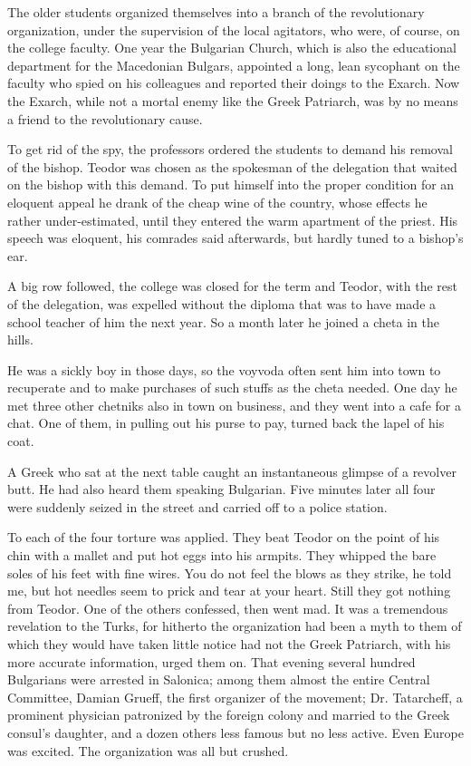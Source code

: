 \documentclass[a5paper,12pt]{book}
\begin{document}
The older students organized themselves into a branch of the revolutionary organization, under the supervision of the local agitators, who were, of course, on the college faculty. One year the Bulgarian Church, which is also the educational department for the Macedonian Bulgars, appointed a long, lean sycophant on the faculty who spied on his colleagues and reported their doings to the Exarch. Now the Exarch, while not a mortal enemy like the Greek Patriarch, was by no means a friend to the revolutionary cause.

To get rid of the spy, the professors ordered the students to demand his removal of the bishop. Teodor was chosen as the spokesman of the delegation that waited on the bishop with this demand. To put himself into the proper condition for an eloquent appeal he drank of the cheap wine of the country, whose effects he rather under-estimated, until they entered the warm apartment of the priest. His speech was eloquent, his comrades said afterwards, but hardly tuned to a bishop's ear.

A big row followed, the college was closed for the term and Teodor, with the rest of the delegation, was expelled without the diploma that was to have made a school teacher of him the next year. So a month later he joined a cheta in the hills.

He was a sickly boy in those days, so the voyvoda often sent him into town to recuperate and to make purchases of such stuffs as the cheta needed. One day he met three other chetniks also in town on business, and they went into a cafe for a chat. One of them, in pulling out his purse to pay, turned back the lapel of his coat.

A Greek who sat at the next table caught an instantaneous glimpse of a revolver butt. He had also heard them speaking Bulgarian. Five minutes later all four were suddenly seized in the street and carried off to a police station.

To each of the four torture was applied. They beat Teodor on the point of his chin with a mallet and put hot eggs into his armpits. They whipped the bare soles of his feet with fine wires. You do not feel the blows as they strike, he told me, but hot needles seem to prick and tear at your heart. Still they got nothing from Teodor. One of the others confessed, then went mad. It was a tremendous revelation to the Turks, for hitherto the organization had been a myth to them of which they would have taken little notice had not the Greek Patriarch, with his more accurate information, urged them on. That evening several hundred Bulgarians were arrested in Salonica; among them almost the entire Central Committee, Damian Grueff, the first organizer of the movement; Dr. Tatarcheff, a prominent physician patronized by the foreign colony and married to the Greek consul’s daughter, and a dozen others less famous but no less active. Even Europe was excited. The organization was all but crushed.
\end{document}
